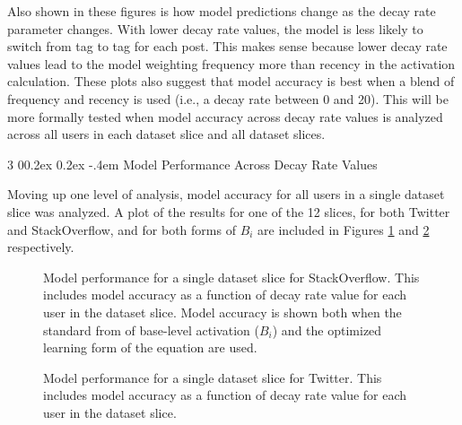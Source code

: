 \documentclass[man,floatsintext,donotrepeattitle]{apa6}
\makeatletter
\renewcommand{\subsubsection}{%
  \@startsection
  {subsubsection}%
  {3}%
  {\parindent}%
  {0\baselineskip \@plus 0.2ex \@minus 0.2ex}%
  {-.4em}%
  {\normalfont\normalsize\bfseries\addperi}}
\makeatother
\begin{document}
Also shown in these figures is how model predictions change as the decay rate parameter changes.
With lower decay rate values, the model is less likely to switch from tag to tag for each post.
This makes sense because lower decay rate values lead to the model weighting frequency more than recency in the activation calculation.
These plots also suggest that model accuracy is best when a blend of frequency and recency is used (i.e., a decay rate between 0 and 20).
This will be more formally tested when model accuracy across decay rate values is analyzed across all users in each dataset slice and all dataset slices.

\subsubsection{Model Performance Across Decay Rate Values}

Moving up one level of analysis, model accuracy for all users in a single dataset slice was analyzed.
A plot of the results for one of the 12 slices, for both Twitter and StackOverflow, and for both forms of $B_{i}$ are included in Figures \ref{figPriorSOQSliceDsStd} and \ref{figPriorTwitterSliceDsStd} respectively.

\begin{figure}[!htbp]
  {%
    \setlength{\fboxsep}{0pt}%
    \setlength{\fboxrule}{1pt}%
    \hfill
    \hfill
    \caption{
    Model performance for a single dataset slice for StackOverflow.
    This includes model accuracy as a function of decay rate value for each user in the dataset slice.
    Model accuracy is shown both when the standard from of base-level activation ($B_{i}$) and the optimized learning form of the equation are used. 
  }
    \label{figPriorSOQSliceDsStd}
  }%
\end{figure}

\begin{figure}[!htbp]
  {%
    \setlength{\fboxsep}{0pt}%
    \setlength{\fboxrule}{1pt}%
    \hfill
    \hfill
    \caption{
      Model performance for a single dataset slice for Twitter.
      This includes model accuracy as a function of decay rate value for each user in the dataset slice.
    }
    \label{figPriorTwitterSliceDsStd}
  }%
\end{figure}
\end{document}
